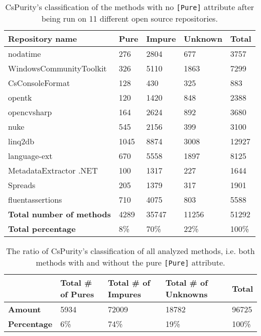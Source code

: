\documentclass[a4paper,12pt]{article}
\begin{document}
\begin{table}[H]
  \small
  \caption{CsPurity's classification of the methods with no \texttt{[Pure]} attribute after being run on 11 different open source repositories.}
  \label{tab:results-non-pure-methods}
  \centering
  \begin{tabular}{|l|lll|l|}
    \hline
    \textbf{Repository name} & \textbf{Pure} & \textbf{Impure} & \textbf{Unknown} & \textbf{Total} \\
    \hline
    nodatime                & 276  & 2804  & 677   & 3757  \\
    WindowsCommunityToolkit & 326  & 5110  & 1863  & 7299  \\
    CsConsoleFormat         & 128  & 430   & 325   & 883   \\
    opentk                  & 120  & 1420  & 848   & 2388  \\
    opencvsharp             & 164  & 2624  & 892   & 3680  \\
    nuke                    & 545  & 2156  & 399   & 3100  \\
    linq2db                 & 1045 & 8874  & 3008  & 12927 \\
    language-ext            & 670  & 5558  & 1897  & 8125  \\
    MetadataExtractor .NET  & 100  & 1317  & 227   & 1644  \\
    Spreads                 & 205  & 1379  & 317   & 1901  \\
    fluentassertions        & 710  & 4075  & 803   & 5588  \\
    \hline
    \rowcolor{lightgray} \textbf{Total number of methods} & 4289 & 35747 & 11256 & \cellcolor{white} 51292 \\
    \rowcolor{lightgray} \textbf{Total percentage}        & 8\%  & 70\%  & 22\%  & \cellcolor{white} 100\% \\
    \hline
  \end{tabular}
\end{table}

\begin{table}[H]
  \small
  \caption{The ratio of CsPurity's classification of all analyzed methods, i.e. both methods with and without the pure \texttt{[Pure]} attribute.}
  \label{tab:results-summary}
  \centering
  \begin{tabular}{|l|lll|l|}
    \hline
                        & \textbf{Total \# of Pures} & \textbf{Total \# of Impures} & \textbf{Total \# of Unknowns} & \textbf{Total} \\
    \hline
    \textbf{Amount}     & 5934 & 72009 & 18782 & 96725 \\
    \textbf{Percentage} & 6\%  & 74\%  & 19\%  & 100\% \\
    \hline
  \end{tabular}
\end{table}
\end{document}
